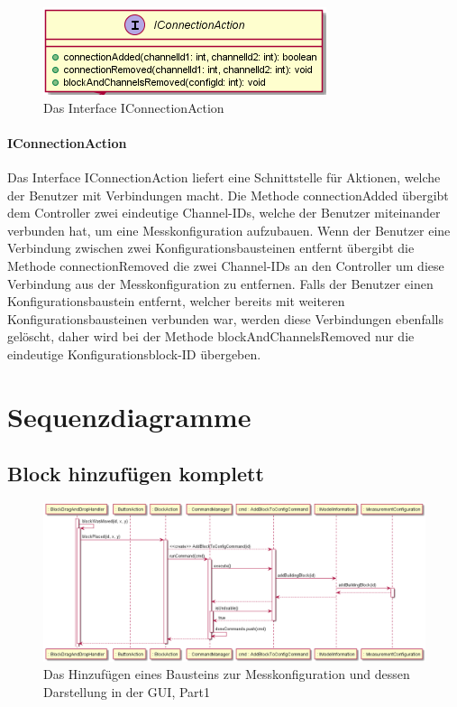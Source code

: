 \documentclass[parskip=full]{scrartcl}
\begin{document}
\begin{figure}[htbp]
	\begin{center}
		\includegraphics[width = 9 cm]{Grafiken/View/IConnectionAction.png}
		\caption{Das Interface IConnectionAction}
		\label{IConnectionAction}
	\end{center}
\end{figure}

\paragraph{IConnectionAction}

Das Interface IConnectionAction liefert eine Schnittstelle für Aktionen, welche der Benutzer mit Verbindungen macht. 
Die Methode connectionAdded übergibt dem Controller zwei eindeutige Channel-IDs, welche der Benutzer miteinander verbunden hat, um eine Messkonfiguration aufzubauen.
Wenn der Benutzer eine Verbindung zwischen zwei Konfigurationsbausteinen entfernt übergibt die Methode connectionRemoved die zwei Channel-IDs an den Controller um diese Verbindung aus der Messkonfiguration zu entfernen.
Falls der Benutzer einen Konfigurationsbaustein entfernt, welcher bereits mit weiteren Konfigurationsbausteinen verbunden war, werden diese Verbindungen ebenfalls gelöscht, daher wird bei der Methode blockAndChannelsRemoved nur die eindeutige Konfigurationsblock-ID übergeben.

\clearpage
\section{Sequenzdiagramme}



\subsection{Block hinzufügen komplett}

\begin{figure}[htbp]
	\begin{center}
		\includegraphics[width = 16cm]{Grafiken/SeqAddBPart1.png}
		\caption{Das Hinzufügen eines Bausteins zur Messkonfiguration und dessen Darstellung in der GUI, Part1}
		\label{SeqAddBPart1}
	\end{center}
\end{figure}
\end{document}
